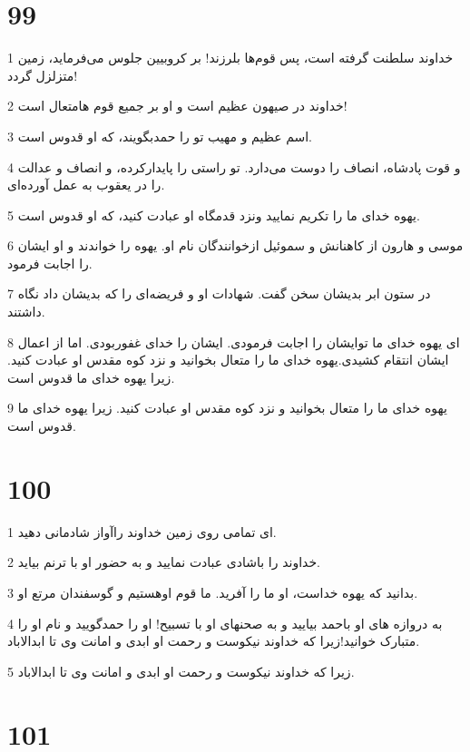 \chapter{99}

\par 1 خداوند سلطنت گرفته است، پس قوم‌ها بلرزند! بر کروبیین جلوس می‌فرماید، زمین متزلزل گردد!
\par 2 خداوند در صیهون عظیم است و او بر جمیع قوم هامتعال است!
\par 3 اسم عظیم و مهیب تو را حمدبگویند، که او قدوس است.
\par 4 و قوت پادشاه، انصاف را دوست می‌دارد. تو راستی را پایدارکرده، و انصاف و عدالت را در یعقوب به عمل آورده‌ای.
\par 5 یهوه خدای ما را تکریم نمایید ونزد قدمگاه او عبادت کنید، که او قدوس است.
\par 6 موسی و هارون از کاهنانش و سموئیل ازخوانندگان نام او. یهوه را خواندند و او ایشان را اجابت فرمود.
\par 7 در ستون ابر بدیشان سخن گفت. شهادات او و فریضه‌ای را که بدیشان داد نگاه داشتند.
\par 8 ‌ای یهوه خدای ما توایشان را اجابت فرمودی. ایشان را خدای غفوربودی. اما از اعمال ایشان انتقام کشیدی.یهوه خدای ما را متعال بخوانید و نزد کوه مقدس او عبادت کنید. زیرا یهوه خدای ما قدوس است.
\par 9 یهوه خدای ما را متعال بخوانید و نزد کوه مقدس او عبادت کنید. زیرا یهوه خدای ما قدوس است.
 
\chapter{100}

\par 1 ای تمامی روی زمین خداوند راآواز شادمانی دهید.
\par 2 خداوند را باشادی عبادت نمایید و به حضور او با ترنم بیاید.
\par 3 بدانید که یهوه خداست، او ما را آفرید. ما قوم اوهستیم و گوسفندان مرتع او.
\par 4 به دروازه های او باحمد بیایید و به صحنهای او با تسبیح! او را حمدگویید و نام او را متبارک خوانید!زیرا که خداوند نیکوست و رحمت او ابدی و امانت وی تا ابدالاباد.
\par 5 زیرا که خداوند نیکوست و رحمت او ابدی و امانت وی تا ابدالاباد.
 
\chapter{101}

